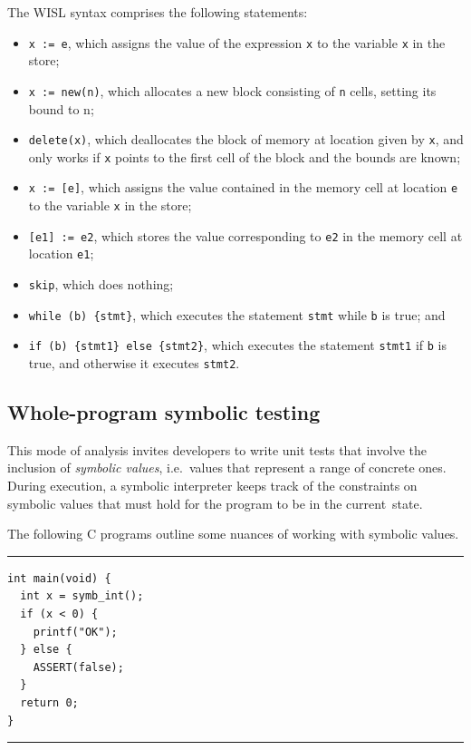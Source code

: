 The WISL syntax comprises the following statements:
\begin{itemize}
  \item \texttt{x := e}, which assigns the value of the expression \texttt{x} to the variable \texttt{x} in the store;
  \item \texttt{x := new(n)}, which allocates a new block consisting of \texttt{n} cells, setting its bound to n;
  \item \texttt{delete(x)}, which deallocates the block of memory at location given by \texttt{x}, and only works if \texttt{x} points to the first cell of the block and the bounds are known;
  \item \texttt{x := [e]}, which assigns the value contained in the memory cell at location \texttt{e} to the variable \texttt{x} in the store;
  \item \texttt{[e1] := e2}, which stores the value corresponding to \texttt{e2} in the memory cell at location \texttt{e1};
  \item \texttt{skip}, which does nothing;
  \item \texttt{while (b) \{stmt\}}, which executes the statement \texttt{stmt} while \texttt{b} is true; and
  \item \texttt{if (b) \{stmt1\} else \{stmt2\}}, which executes the statement \texttt{stmt1} if \texttt{b} is true, and otherwise it executes \texttt{stmt2}.
\end{itemize}

\subsection{Whole-program symbolic testing}

This mode of analysis invites developers to write unit tests that involve the
inclusion of \textit{symbolic values}, i.e.\ values that represent a range of
concrete ones. During execution, a symbolic interpreter keeps track of the
constraints on symbolic values that must hold for the program to be in the
current~state.

The following C programs outline some nuances of working with symbolic values.

\noindent\rule{\textwidth}{0.5pt}
\vspace{-0.6cm}
\begin{verbatim}
int main(void) {
  int x = symb_int();
  if (x < 0) {
    printf("OK");
  } else {
    ASSERT(false);
  }
  return 0;
}
\end{verbatim}
\vspace{-0.4cm}
\noindent\rule{\textwidth}{0.5pt}
\vspace{-0.6cm}
\vspace{0.5cm}

